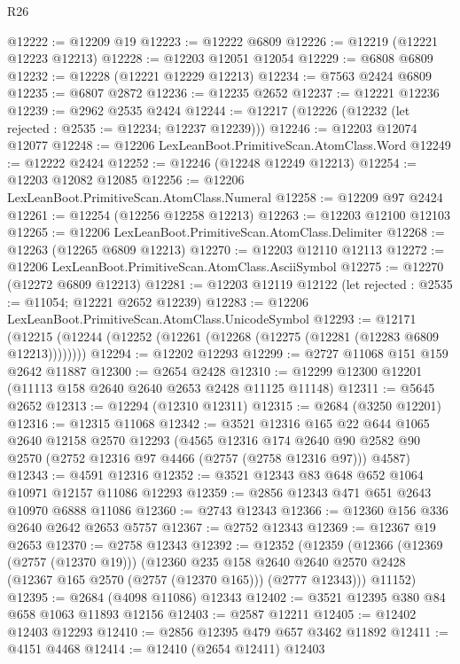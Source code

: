 \begin{lexlean}{R26}
\begin{coremodule}
@12222 := @12209 @19
@12223 := @12222 @6809
@12226 := @12219 (@12221 @12223 @12213)
@12228 := @12203 @12051 @12054
@12229 := @6808 @6809
@12232 := @12228 (@12221 @12229 @12213)
@12234 := @7563 @2424 @6809
@12235 := @6807 @2872
@12236 := @12235 @2652
@12237 := @12221 @12236
@12239 := @2962 @2535 @2424
@12244 := @12217 (@12226 (@12232 (let rejected : @2535 := @12234; @12237 @12239)))
@12246 := @12203 @12074 @12077
@12248 := @12206 LexLeanBoot.PrimitiveScan.AtomClass.Word
@12249 := @12222 @2424
@12252 := @12246 (@12248 @12249 @12213)
@12254 := @12203 @12082 @12085
@12256 := @12206 LexLeanBoot.PrimitiveScan.AtomClass.Numeral
@12258 := @12209 @97 @2424
@12261 := @12254 (@12256 @12258 @12213)
@12263 := @12203 @12100 @12103
@12265 := @12206 LexLeanBoot.PrimitiveScan.AtomClass.Delimiter
@12268 := @12263 (@12265 @6809 @12213)
@12270 := @12203 @12110 @12113
@12272 := @12206 LexLeanBoot.PrimitiveScan.AtomClass.AsciiSymbol
@12275 := @12270 (@12272 @6809 @12213)
@12281 := @12203 @12119 @12122 (let rejected : @2535 := @11054; @12221 @2652 @12239)
@12283 := @12206 LexLeanBoot.PrimitiveScan.AtomClass.UnicodeSymbol
@12293 := @12171
    (@12215 (@12244 (@12252 (@12261 (@12268 (@12275 (@12281 (@12283 @6809 @12213))))))))
@12294 := @12202 @12293
@12299 := @2727 @11068 @151 @159 @2642 @11887
@12300 := @2654 @2428
@12310 := @12299 @12300 @12201 (@11113 @158 @2640 @2640 @2653 @2428 @11125 @11148)
@12311 := @5645 @2652
@12313 := @12294 (@12310 @12311)
@12315 := @2684 (@3250 @12201)
@12316 := @12315 @11068
@12342 := @3521
    @12316
    @165
    @22
    @644
    @1065
    @2640
    @12158
    @2570
    @12293
    (@4565
      @12316
      @174
      @2640
      @90
      @2582
      @90
      @2570
      (@2752 @12316 @97 @4466 (@2757 (@2758 @12316 @97)))
      @4587)
@12343 := @4591 @12316
@12352 := @3521 @12343 @83 @648 @652 @1064 @10971 @12157 @11086 @12293
@12359 := @2856 @12343 @471 @651 @2643 @10970 @6888 @11086
@12360 := @2743 @12343
@12366 := @12360 @156 @336 @2640 @2642 @2653 @5757
@12367 := @2752 @12343
@12369 := @12367 @19 @2653
@12370 := @2758 @12343
@12392 := @12352
    (@12359
      (@12366
        (@12369 (@2757 (@12370 @19)))
        (@12360
          @235
          @158
          @2640
          @2640
          @2570
          @2428
          (@12367 @165 @2570 (@2757 (@12370 @165)))
          (@2777 @12343)))
      @11152)
@12395 := @2684 (@4098 @11086) @12343
@12402 := @3521 @12395 @380 @84 @658 @1063 @11893 @12156
@12403 := @2587 @12211
@12405 := @12402 @12403 @12293
@12410 := @2856 @12395 @479 @657 @3462 @11892
@12411 := @4151 @4468
@12414 := @12410 (@2654 @12411) @12403

\end{coremodule}
\end{lexlean}
